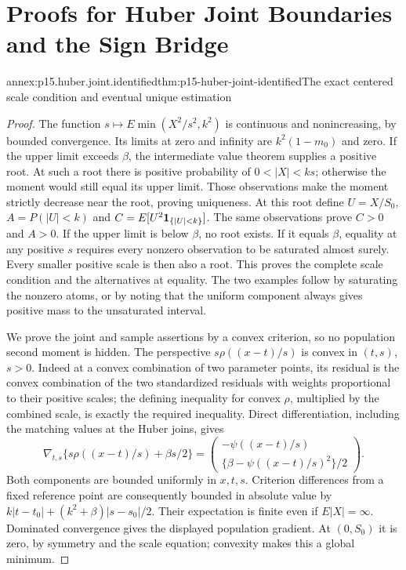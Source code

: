 \chapter{Proofs for Huber Joint Boundaries and the Sign Bridge}
\label{annex:p15-huber-joint-endpoints}

\begin{annexitem}{annex:p15.huber.joint.identified}{thm:p15-huber-joint-identified}{The exact centered scale condition and eventual unique estimation}
\begin{proof}
The function \(s\mapsto E\min(X^2/s^2,k^2)\) is continuous and
nonincreasing, by bounded convergence. Its limits at zero and
infinity are \(k^2(1-m_0)\) and zero. If the upper limit exceeds
\(\beta\), the intermediate value theorem supplies a positive root.
At such a root there is positive probability of
\(0<|X|<ks\); otherwise the moment would still equal its upper
limit. Those observations make the moment strictly decrease near
the root, proving uniqueness. At this root define
\(U=X/S_0\), \(A=P(|U|<k)\) and
\(C=E[U^2{\bf1}_{\{|U|<k\}}]\).
The same observations prove \(C>0\) and \(A>0\).
If the upper limit is below \(\beta\), no root exists.
If it equals \(\beta\), equality at any positive \(s\) requires
every nonzero observation to be saturated almost surely.
Every smaller positive scale is then also a root. This proves the
complete scale condition and the alternatives at equality.
The two examples follow by saturating the nonzero atoms, or by
noting that the uniform component always gives positive mass to
the unsaturated interval.

We prove the joint and sample assertions by a convex criterion,
so no population second moment is hidden. The perspective
\(s\rho((x-t)/s)\) is convex in \((t,s)\), \(s>0\).
Indeed at a convex combination of two parameter points, its
residual is the convex combination of the two standardized
residuals with weights proportional to their positive scales;
the defining inequality for convex \(\rho\), multiplied by the
combined scale, is exactly the required inequality.
Direct differentiation, including the matching values at the
Huber joins, gives
\[
 \nabla_{t,s}\{s\rho((x-t)/s)+\beta s/2\}
 =\begin{pmatrix}
 -\psi((x-t)/s)\\
 \{\beta-\psi((x-t)/s)^2\}/2
 \end{pmatrix}.
\]
Both components are bounded uniformly in \(x,t,s\).
Criterion differences from a fixed reference point are consequently
bounded in absolute value by
\(k|t-t_0|+(k^2+\beta)|s-s_0|/2\).
Their expectation is finite even if \(E|X|=\infty\).
Dominated convergence gives the displayed population gradient.
At \((0,S_0)\) it is zero, by symmetry and the scale equation;
convexity makes this a global minimum.


\end{proof}
\end{annexitem}
